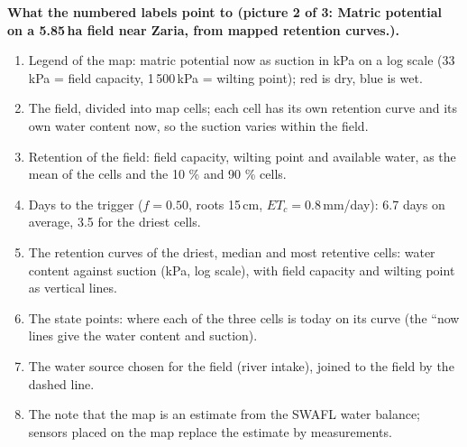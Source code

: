 \textbf{What the numbered labels point to (picture 2 of 3: Matric potential on a 5.85\,ha field near Zaria, from mapped retention curves.).}
\begin{enumerate}[nosep,label=\protect\circled{\arabic*}]
\item Legend of the map: matric potential now as suction in kPa on a log scale (33\,kPa = field capacity, 1\,500\,kPa = wilting point); red is dry, blue is wet.
\item The field, divided into map cells; each cell has its own retention curve and its own water content now, so the suction varies within the field.
\item Retention of the field: field capacity, wilting point and available water, as the mean of the cells and the 10 \% and 90 \% cells.
\item Days to the trigger ($f=0.50$, roots 15\,cm, $ET_c=0.8$\,mm/day): 6.7 days on average, 3.5 for the driest cells.
\item The retention curves of the driest, median and most retentive cells: water content against suction (kPa, log scale), with field capacity and wilting point as vertical lines.
\item The state points: where each of the three cells is today on its curve (the ``now lines give the water content and suction).
\item The water source chosen for the field (river intake), joined to the field by the dashed line.
\item The note that the map is an estimate from the SWAFL water balance; sensors placed on the map replace the estimate by measurements.
\end{enumerate}

